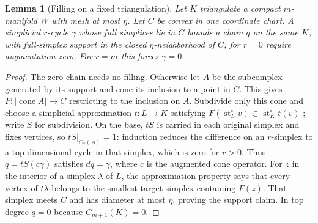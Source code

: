 \documentclass[11pt]{amsart}
\numberwithin{equation}{section}
\newtheorem{lemma}[lemma]{Lemma}
\theoremstyle{definition}
\theoremstyle{remark}
\begin{document}
\begin{lemma}[Filling on a fixed triangulation]
\label{lem:unchanged-target-filling}
Let $K$ triangulate a compact $m$-manifold $W$ with mesh at most $\eta$.
Let $C$ be convex in one coordinate chart.  A simplicial $r$-cycle $\gamma$
whose full simplices lie in $C$ bounds a chain $q$ on the same $K$, with
full-simplex support in the closed $\eta$-neighborhood of $C$; for $r=0$
require augmentation zero.  For $r=m$ this forces $\gamma=0$.
\end{lemma}
\begin{proof}
The zero chain needs no filling.  Otherwise let $A$ be the subcomplex
generated by its support and cone its inclusion to a point in $C$.
This gives $F:|\operatorname{cone}A|\to C$ restricting to the inclusion
on $A$.  Subdivide only this cone and choose a simplicial approximation
$t:L\to K$ satisfying
$F(\operatorname{st}^{\circ}_Lv)\subset\operatorname{st}^{\circ}_Kt(v)$
\cite[Theorem 2C.1 and its proof]{Hat02}; write $S$ for subdivision.
On the base, $tS$ is carried in each original simplex and fixes vertices,
so $tS|_{C_*(A)}=1$: induction reduces the difference on an $r$-simplex
to a top-dimensional cycle in that simplex, which is zero for $r>0$.
Thus $q=tS(c\gamma)$ satisfies $dq=\gamma$, where $c$ is the augmented
cone operator.  For $z$ in the interior of a simplex $\lambda$ of $L$,
the approximation property says that every vertex of $t\lambda$ belongs
to the smallest target simplex containing $F(z)$.  That simplex meets
$C$ and has diameter at most $\eta$, proving the support claim.
In top degree $q=0$ because $C_{m+1}(K)=0$.
\end{proof}
\end{document}
